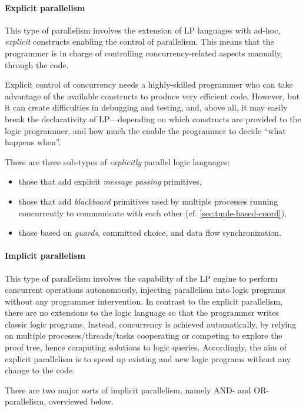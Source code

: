 \documentclass[12pt,a4paper,openright,twoside]{book}
\begin{document}
\paragraph{Explicit parallelism}

This type of parallelism involves the extension of LP languages with ad-hoc, \emph{explicit} constructs enabling the control of parallelism.
%
This means that the programmer is in charge of controlling concurrency-related aspects manually, through the code.

Explicit control of concurrency needs a highly-skilled programmer who can take advantage of the available constructs to produce very efficient code.
%
However, but it can create difficulties in debugging and testing, and, above all, it may easily break the declarativity of LP---depending on which constructs are provided to the logic programmer, and how much the enable the programmer to decide ``what happens when''.

There are three sub-types of \emph{explicitly} parallel logic languages:
%
\begin{itemize}
    \item those that add explicit \emph{message passing} primitives,
    \item those that add \emph{blackboard} primitives used by multiple processes running concurrently to communicate with each other (cf. \cref{sec:tuple-based-coord}),
    \item those based on \emph{guards}, committed choice, and data flow synchronization.
\end{itemize}

\paragraph{Implicit parallelism}

This type of parallelism involves the capability of the LP engine to perform concurrent operations autonomously, injecting parallelism into logic programs without any programmer intervention.
%
In contrast to the explicit parallelism, there are no extensions to the logic language so that the programmer writes classic logic programs.
%
Instead, concurrency is achieved automatically, by relying on multiple processes/threads/tasks cooperating or competing to explore the proof tree, hence computing solutions to logic queries.
%
Accordingly, the aim of explicit parallelism is to speed up existing and new logic programs without any change to the code.

There are two major sorts of implicit parallelism, namely AND- and OR-parallelism, overviewed below.
\end{document}
